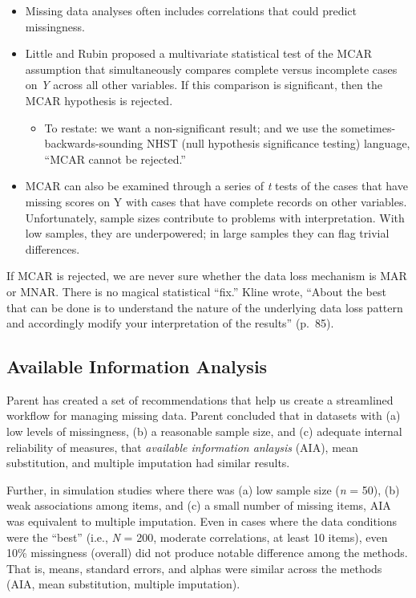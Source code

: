 \documentclass[
  english,
]{book}
\providecommand{\tightlist}{%
  \setlength{\itemsep}{0pt}\setlength{\parskip}{0pt}}
\begin{document}
\begin{itemize}
\tightlist
\item
  Missing data analyses often includes correlations that could predict missingness.
\item
  Little and Rubin \citep{little_statistical_2002} proposed a multivariate statistical test of the MCAR assumption that simultaneously compares complete versus incomplete cases on \emph{Y} across all other variables. If this comparison is significant, then the MCAR hypothesis is rejected.

  \begin{itemize}
  \tightlist
  \item
    To restate: we want a non-significant result; and we use the sometimes-backwards-sounding NHST (null hypothesis significance testing) language, ``MCAR cannot be rejected.''
  \end{itemize}
\item
  MCAR can also be examined through a series of \emph{t} tests of the cases that have missing scores on Y with cases that have complete records on other variables. Unfortunately, sample sizes contribute to problems with interpretation. With low samples, they are underpowered; in large samples they can flag trivial differences.
\end{itemize}

If MCAR is rejected, we are never sure whether the data loss mechanism is MAR or MNAR. There is no magical statistical ``fix.'' Kline \citeyearpar{kline_principles_2016} wrote, ``About the best that can be done is to understand the nature of the underlying data loss pattern and accordingly modify your interpretation of the results'' (p.~85).

\hypertarget{available-information-analysis}{%
\subsection{Available Information Analysis}\label{available-information-analysis}}

Parent \citeyearpar{parent_handling_2013} has created a set of recommendations that help us create a streamlined workflow for managing missing data. Parent concluded that in datasets with (a) low levels of missingness, (b) a reasonable sample size, and (c) adequate internal reliability of measures, that \emph{available information anlaysis} (AIA), mean substitution, and multiple imputation had similar results.

Further, in simulation studies where there was (a) low sample size (\emph{n} = 50), (b) weak associations among items, and (c) a small number of missing items, AIA was equivalent to multiple imputation. Even in cases where the data conditions were the ``best'' (i.e., \emph{N} = 200, moderate correlations, at least 10 items), even 10\% missingness (overall) did not produce notable difference among the methods. That is, means, standard errors, and alphas were similar across the methods (AIA, mean substitution, multiple imputation).
\end{document}
